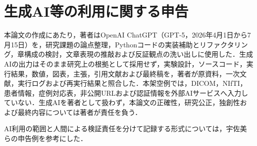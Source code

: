 \chapter*{生成AI等の利用に関する申告}

\UsamiFictionalExampleNotice
\par\vspace{1.5\baselineskip}

本論文の作成にあたり，著者はOpenAI ChatGPT（GPT-5，2026年4月1日から7月15日）を，研究課題の論点整理，Pythonコードの実装補助とリファクタリング，章構成の検討，文章表現の推敲および反証観点の洗い出しに使用した．生成AIの出力はそのまま研究上の根拠として採用せず，実験設計，ソースコード，実行結果，数値，図表，主張，引用文献および最終稿を，著者が原資料，一次文献，実行ログおよび再実行結果と照合した．本架空例では，DICOM，NIfTI，患者情報，症例対応表，非公開URLおよび認証情報を外部AIサービスへ入力していない．生成AIを著者として扱わず，本論文の正確性，研究公正，独創性および最終内容については著者が責任を負う．

AI利用の範囲と人間による検証責任を分けて記録する形式については，宇佐美ら\cite{usami2026darkcurrent}の申告例を参考にした．

